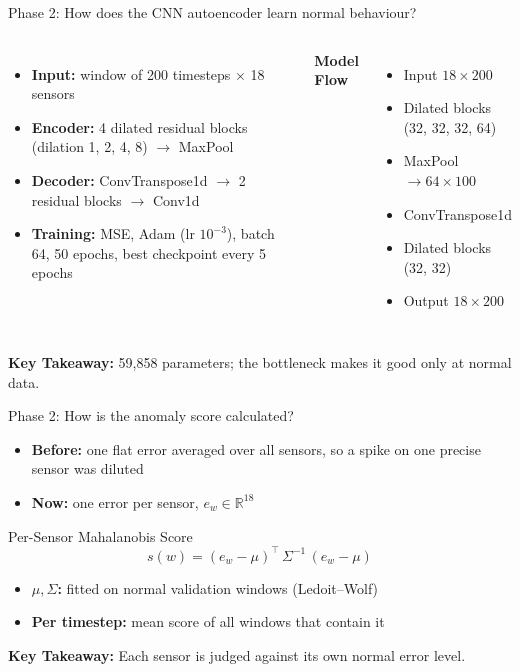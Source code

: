\documentclass{beamer}
\newcommand{\takeaway}[1]{\par\vspace{0.4em}\noindent\textbf{Key Takeaway:} #1}
\begin{document}
\begin{frame}{Phase 2: How does the CNN autoencoder learn normal behaviour?}
\begin{columns}[T]
\begin{itemize}
  \item \textbf{Input:} window of 200 timesteps $\times$ 18 sensors
  \item \textbf{Encoder:} 4 dilated residual blocks (dilation 1, 2, 4, 8) $\rightarrow$ MaxPool
  \item \textbf{Decoder:} ConvTranspose1d $\rightarrow$ 2 residual blocks $\rightarrow$ Conv1d
  \item \textbf{Training:} MSE, Adam (lr $10^{-3}$), batch 64, 50 epochs, best checkpoint every 5 epochs
\end{itemize}
\centering
\textbf{Model Flow}
\begin{itemize}
  \item Input $18\times200$
  \item Dilated blocks (32, 32, 32, 64)
  \item MaxPool $\rightarrow 64\times100$
  \item ConvTranspose1d
  \item Dilated blocks (32, 32)
  \item Output $18\times200$
\end{itemize}
\end{columns}
\vspace{0.3em}
\takeaway{59,858 parameters; the bottleneck makes it good only at normal data.}
\end{frame}

\begin{frame}{Phase 2: How is the anomaly score calculated?}
\begin{itemize}
  \item \textbf{Before:} one flat error averaged over all sensors, so a spike on one precise sensor was diluted
  \item \textbf{Now:} one error per sensor, $e_w \in \mathbb{R}^{18}$
\end{itemize}
\begin{block}{Per-Sensor Mahalanobis Score}
\[
s(w) = (e_w - \mu)^{\top}\, \Sigma^{-1}\, (e_w - \mu)
\]
\end{block}
\begin{itemize}
  \item \textbf{$\mu, \Sigma$:} fitted on normal validation windows (Ledoit--Wolf)
  \item \textbf{Per timestep:} mean score of all windows that contain it
\end{itemize}
\takeaway{Each sensor is judged against its own normal error level.}
\end{frame}
\end{document}
